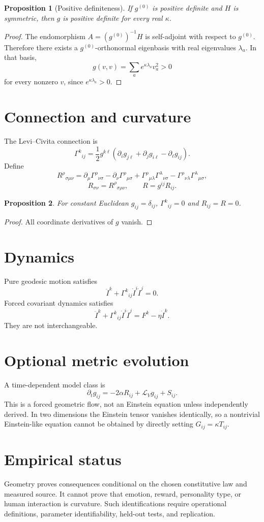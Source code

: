 \documentclass[11pt]{article}
\newtheorem{proposition}{Proposition}
\begin{document}
\begin{proposition}[Positive definiteness]
If $g^{(0)}$ is positive definite and $H$ is symmetric, then $g$ is positive definite for every real $\kappa$.
\end{proposition}
\begin{proof}
The endomorphism $A=(g^{(0)})^{-1}H$ is self-adjoint with respect to $g^{(0)}$. Therefore there exists a $g^{(0)}$-orthonormal eigenbasis with real eigenvalues $\lambda_a$. In that basis,
\[
g(v,v)=\sum_a e^{\kappa\lambda_a}v_a^2>0
\]
for every nonzero $v$, since $e^{\kappa\lambda_a}>0$.
\end{proof}

\section{Connection and curvature}
The Levi--Civita connection is
\[
\Gamma^k{}_{ij}=\frac12g^{k\ell}
(\partial_i g_{j\ell}+\partial_jg_{i\ell}-\partial_\ell g_{ij}).
\]
Define
\[
R^\rho{}_{\sigma\mu\nu}
=\partial_\mu\Gamma^\rho{}_{\nu\sigma}
-\partial_\nu\Gamma^\rho{}_{\mu\sigma}
+\Gamma^\rho{}_{\mu\lambda}\Gamma^\lambda{}_{\nu\sigma}
-\Gamma^\rho{}_{\nu\lambda}\Gamma^\lambda{}_{\mu\sigma},
\]
\[
R_{\sigma\nu}=R^\rho{}_{\sigma\rho\nu},
\qquad
R=g^{ij}R_{ij}.
\]

\begin{proposition}
For constant Euclidean $g_{ij}=\delta_{ij}$, $\Gamma^k{}_{ij}=0$ and $R_{ij}=R=0$.
\end{proposition}
\begin{proof}
All coordinate derivatives of $g$ vanish.
\end{proof}

\section{Dynamics}
Pure geodesic motion satisfies
\[
\ddot I^k+\Gamma^k{}_{ij}\dot I^i\dot I^j=0.
\]
Forced covariant dynamics satisfies
\[
\ddot I^k+\Gamma^k{}_{ij}\dot I^i\dot I^j=F^k-\eta\dot I^k.
\]
They are not interchangeable.

\section{Optional metric evolution}
A time-dependent model class is
\[
\partial_tg_{ij}
=-2\alpha R_{ij}
+\mathcal L_Vg_{ij}
+S_{ij}.
\]
This is a forced geometric flow, not an Einstein equation unless independently derived. In two dimensions the Einstein tensor vanishes identically, so a nontrivial Einstein-like equation cannot be obtained by directly setting $G_{ij}=\kappa T_{ij}$.

\section{Empirical status}
Geometry proves consequences conditional on the chosen constitutive law and measured source. It cannot prove that emotion, reward, personality type, or human interaction is curvature. Such identifications require operational definitions, parameter identifiability, held-out tests, and replication.
\end{document}
